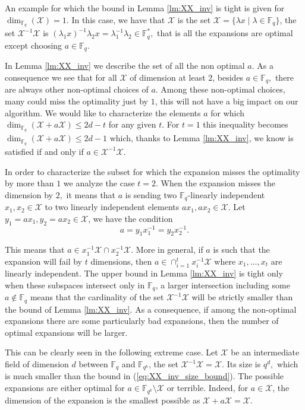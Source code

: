 \documentclass{article}
\newcommand{\Fq}{\mathbb{F}_{q}}
\newcommand{\Fqk}{\mathbb{F}_{q^k}}
\newcommand{\calX}{\mathcal{X}}
\begin{document}
An example for which the bound in Lemma \ref{lm:XX_inv} is tight is given for $\dim_{\Fq}(\calX) = 1.$ In this case, we have that $\calX$ is  the set $\calX = \{ \lambda x \mid \lambda \in \Fq \}$, the set $\calX^{-1} \calX$ is  $(\lambda_1 x)^{-1} \lambda_2 x = \lambda_1^{-1} \lambda_2 \in \Fq^*,$ that is all the expansions are optimal except choosing $a \in \Fq.$

In Lemma \ref{lm:XX_inv} we describe the set of all the non optimal $a$.
As a consequence we see that for all $\calX$ of dimension at least $2$, besides $a \in \Fq,$ there are always other non-optimal choices of $a.$
Among these non-optimal choices, many could miss the optimality just by $1$, this will not have a big impact on our algorithm.
We would like to characterize the elements $a$ for which $\dim_{\Fq}(\calX + a \calX) \leq 2d - t$ for any given $t.$
For $t=1$ this inequality becomes $\dim_{\Fq}(\calX + a \calX) \leq 2d - 1$ which, thanks to Lemma \ref{lm:XX_inv}, we know is satisfied if and only if $a \in \calX^{-1} \calX$.

In order to characterize the subset for which the expansion misses the optimality by more than $1$ we analyze the case $t=2.$
When the expansion misses the dimension by $2,$ it means that $a$ is sending two $\Fq$-linearly independent $x_1,x_2 \in \calX$ to two linearly independent elements $a x_1, a x_2 \in \calX.$
Let $y_1 = ax_1, y_2 = ax_2 \in \calX$, we have the condition
\begin{equation}\label{eq:a_double}
    a = y_1 x_1^{-1} = y_2 x_2^{-1}.
\end{equation}

This means that $a \in x_1^{-1} \calX \cap x_2^{-1} \calX.$
More in general, if $a$ is such that the expansion will fail by $t$ dimensions, then $a \in \cap_{i=1}^t x_i^{-1} \calX$ where $x_1,\ldots, x_t$ are linearly independent.
The upper bound in Lemma \ref{lm:XX_inv} is tight only when these subspaces intersect only in $\Fq$, a larger intersection including some $a \notin \Fq$ means that the cardinality of the set $\calX^{-1} \calX$ will be strictly smaller than the bound of Lemma \ref{lm:XX_inv}.
As a consequence, if among the non-optimal expansions there are some particularly bad expansions, then the number of optimal expansions will be larger.

This can be clearly seen in the following extreme case.
Let $\calX$ be an intermediate field of dimension $d$ between $\Fq$ and $\Fqk$, the set $ \calX^{-1} \calX = \calX.$
Its size is $q^d,$ which is much smaller than the bound in (\ref{eq:XX_inv_size_bound}).
The possible expansions are either optimal for $a \in \Fqk \setminus \calX$ or terrible.
Indeed, for $a \in \calX$, the dimension of the expansion is the smallest possible as $\calX + a \calX = \calX.$
\end{document}
